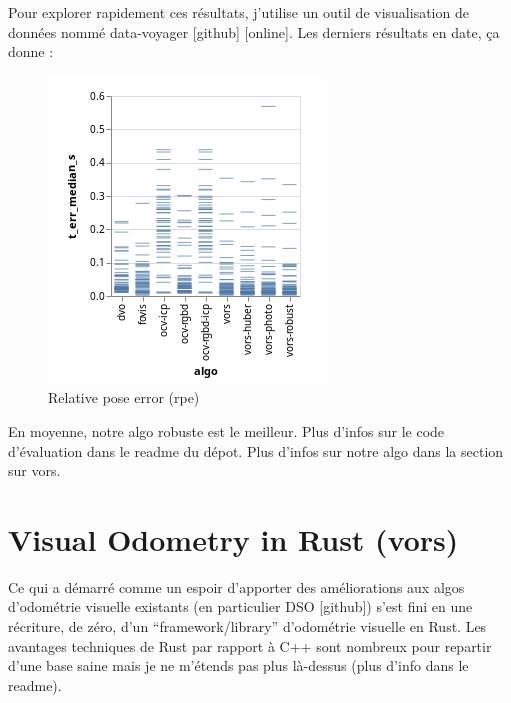 Pour explorer rapidement ces résultats, j’utilise un outil de visualisation de données nommé data-voyager [github] [online]. Les derniers résultats en date, ça donne :

\begin{figure}[ht]
	\centering
	\includegraphics[width=\linewidth]{assets/img/rpe-2019-04-04.png}
	\caption{Relative pose error (rpe)}%
	\label{fig:rpe-eval}
\end{figure}

En moyenne, notre algo robuste est le meilleur. Plus d’infos sur le code d’évaluation dans le readme du dépot. Plus d’infos sur notre algo dans la section sur vors.

\section{Visual Odometry in Rust (vors)}%
\label{sec:vors}

Ce qui a démarré comme un espoir d’apporter des améliorations aux algos d’odométrie visuelle existants (en particulier DSO [github]) s’est fini en une récriture, de zéro, d’un “framework/library” d’odométrie visuelle en Rust. Les avantages techniques de Rust par rapport à C++ sont nombreux pour repartir d’une base saine mais je ne m’étends pas plus là-dessus (plus d’info dans le readme).

